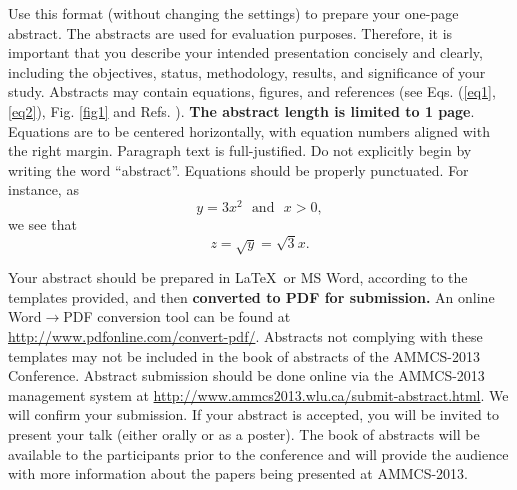 \documentclass[11pt]{article}
\begin{document}
Use this format (without changing the settings) to prepare your one-page abstract. The abstracts are used for evaluation purposes. Therefore, it is important that you describe  your intended presentation concisely and clearly, including the objectives, status, methodology, results, and significance of your study.
 Abstracts may contain equations, figures, and references (see Eqs. (\ref{eq1},\ref{eq2}), Fig. \ref{fig1} and Refs. \cite{KR,WK,ABS}). {\bf The abstract length is limited to 1  page}.  Equations are to be centered horizontally, with equation numbers aligned with the right margin.  Paragraph text is full-justified.  Do not explicitly begin by writing the word ``abstract''.  Equations should be properly punctuated.  For instance, as
\begin{equation}
y=3x^2\  \  \  \mbox{and}\  \  \  x>0, \label{eq1}
\end{equation}
we see that
\begin{equation}
z=\sqrt{y}=\sqrt{3}x. \label{eq2}
\end{equation}

Your abstract should be prepared in \LaTeX\ or MS Word, according to the templates provided, and then \textbf{converted to PDF for submission.}  An online Word$\rightarrow$PDF conversion tool can be found at \url{http://www.pdfonline.com/convert-pdf/}.  Abstracts not complying with these templates may not be included in the book of abstracts of the AMMCS-2013 Conference. Abstract submission should be done online via the AMMCS-2013 management system at
\url{http://www.ammcs2013.wlu.ca/submit-abstract.html}. We will confirm your submission. If your abstract is accepted, you will be invited to present your talk (either orally or as a poster).
The book of abstracts will be available to the participants prior to the conference and will provide the audience with more information
about the papers being presented at AMMCS-2013.
%
%
\end{document}
